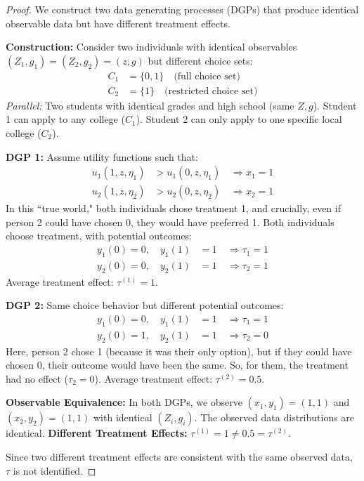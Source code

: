 \documentclass{article}
\begin{document}
\begin{proof}
We construct two data generating processes (DGPs) that produce identical observable data but have different treatment effects.

\textbf{Construction:} Consider two individuals with identical observables $(Z_1, g_1) = (Z_2, g_2) = (z, g)$ but different choice sets:
\begin{align}
C_1 &= \{0, 1\} \quad \text{(full choice set)} \\
C_2 &= \{1\} \quad \text{(restricted choice set)}
\end{align}
\textit{Parallel:} Two students with identical grades and high school (same $Z,g$). Student 1 can apply to any college ($C_1$). Student 2 can only apply to one specific local college ($C_2$).

\textbf{DGP 1:} Assume utility functions such that:
\begin{align}
u_1(1, z, \eta_1) &> u_1(0, z, \eta_1) \quad \Rightarrow x_1 = 1 \\
u_2(1, z, \eta_2) &> u_2(0, z, \eta_2) \quad \Rightarrow x_2 = 1
\end{align}
In this ``true world," both individuals chose treatment 1, and crucially, even if person 2 could have chosen 0, they would have preferred 1.
Both individuals choose treatment, with potential outcomes:
\begin{align}
y_1(0) = 0, \quad y_1(1) &= 1 \quad \Rightarrow \tau_1 = 1 \\
y_2(0) = 0, \quad y_2(1) &= 1 \quad \Rightarrow \tau_2 = 1
\end{align}
Average treatment effect: $\tau^{(1)} = 1$.

\textbf{DGP 2:} Same choice behavior but different potential outcomes:
\begin{align}
y_1(0) = 0, \quad y_1(1) &= 1 \quad \Rightarrow \tau_1 = 1 \\
y_2(0) = 1, \quad y_2(1) &= 1 \quad \Rightarrow \tau_2 = 0
\end{align}
Here, person 2 chose 1 (because it was their only option), but if they could have chosen 0, their outcome would have been the same. So, for them, the treatment had no effect ($\tau_2=0$).
Average treatment effect: $\tau^{(2)} = 0.5$.

\textbf{Observable Equivalence:} In both DGPs, we observe $(x_1, y_1) = (1, 1)$ and $(x_2, y_2) = (1, 1)$ with identical $(Z_i, g_i)$. The observed data distributions are identical.
\textbf{Different Treatment Effects:} $\tau^{(1)} = 1 \neq 0.5 = \tau^{(2)}$.

Since two different treatment effects are consistent with the same observed data, $\tau$ is not identified.
\end{proof}
\end{document}
